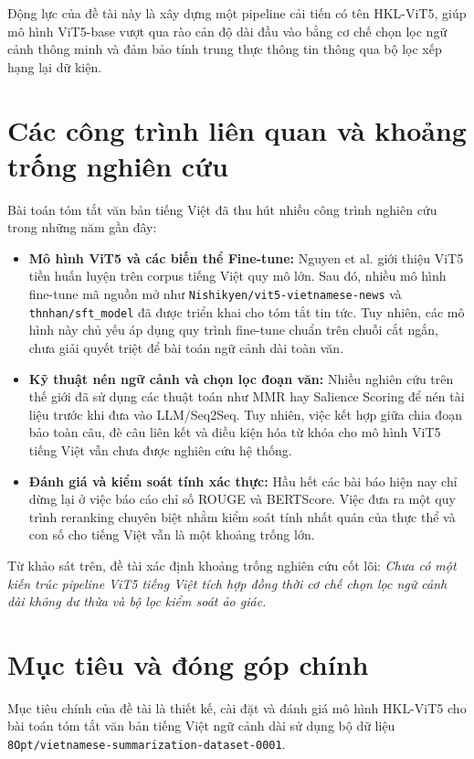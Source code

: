 Động lực của đề tài này là xây dựng một pipeline cải tiến có tên HKL-ViT5, giúp mô hình ViT5-base vượt qua rào cản độ dài đầu vào bằng cơ chế chọn lọc ngữ cảnh thông minh và đảm bảo tính trung thực thông tin thông qua bộ lọc xếp hạng lại dữ kiện.

\section{Các công trình liên quan và khoảng trống nghiên cứu}

Bài toán tóm tắt văn bản tiếng Việt đã thu hút nhiều công trình nghiên cứu trong những năm gần đây:

\begin{itemize}
  \item \textbf{Mô hình ViT5 và các biến thể Fine-tune:} Nguyen et al. \cite{Nguyen2022} giới thiệu ViT5 tiền huấn luyện trên corpus tiếng Việt quy mô lớn. Sau đó, nhiều mô hình fine-tune mã nguồn mở như \texttt{Nishikyen/vit5-vietnamese-news} và \texttt{thnhan/sft\_model} đã được triển khai cho tóm tắt tin tức. Tuy nhiên, các mô hình này chủ yếu áp dụng quy trình fine-tune chuẩn trên chuỗi cắt ngắn, chưa giải quyết triệt để bài toán ngữ cảnh dài toàn văn.
  \item \textbf{Kỹ thuật nén ngữ cảnh và chọn lọc đoạn văn:} Nhiều nghiên cứu trên thế giới đã sử dụng các thuật toán như MMR hay Salience Scoring để nén tài liệu trước khi đưa vào LLM/Seq2Seq. Tuy nhiên, việc kết hợp giữa chia đoạn bảo toàn câu, đè câu liên kết và điều kiện hóa từ khóa cho mô hình ViT5 tiếng Việt vẫn chưa được nghiên cứu hệ thống.
  \item \textbf{Đánh giá và kiểm soát tính xác thực:} Hầu hết các bài báo hiện nay chỉ dừng lại ở việc báo cáo chỉ số ROUGE và BERTScore. Việc đưa ra một quy trình reranking chuyên biệt nhằm kiểm soát tính nhất quán của thực thể và con số cho tiếng Việt vẫn là một khoảng trống lớn.
\end{itemize}

Từ khảo sát trên, đề tài xác định khoảng trống nghiên cứu cốt lõi: \textit{Chưa có một kiến trúc pipeline ViT5 tiếng Việt tích hợp đồng thời cơ chế chọn lọc ngữ cảnh dài không dư thừa và bộ lọc kiểm soát ảo giác.}

\section{Mục tiêu và đóng góp chính}

Mục tiêu chính của đề tài là thiết kế, cài đặt và đánh giá mô hình HKL-ViT5 cho bài toán tóm tắt văn bản tiếng Việt ngữ cảnh dài sử dụng bộ dữ liệu \texttt{8Opt/vietnamese-summarization-dataset-0001}.

